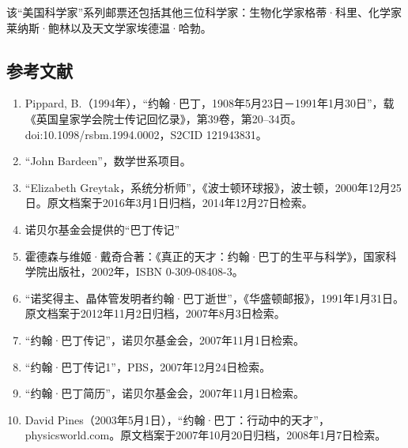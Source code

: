 该“美国科学家”系列邮票还包括其他三位科学家：生物化学家格蒂·科里、化学家莱纳斯·鲍林以及天文学家埃德温·哈勃。
\subsection{参考文献}
\begin{enumerate}
\item Pippard, B.（1994年），“约翰·巴丁，1908年5月23日－1991年1月30日”，载《英国皇家学会院士传记回忆录》，第39卷，第20–34页。doi:10.1098/rsbm.1994.0002，S2CID 121943831。
\item “John Bardeen”，数学世系项目。
\item “Elizabeth Greytak，系统分析师”，《波士顿环球报》，波士顿，2000年12月25日。原文档案于2016年3月1日归档，2014年12月27日检索。
\item 诺贝尔基金会提供的“巴丁传记”
\item 霍德森与维姬·戴奇合著：《真正的天才：约翰·巴丁的生平与科学》，国家科学院出版社，2002年，ISBN 0-309-08408-3。
\item “诺奖得主、晶体管发明者约翰·巴丁逝世”，《华盛顿邮报》，1991年1月31日。原文档案于2012年11月2日归档，2007年8月3日检索。
\item “约翰·巴丁传记”，诺贝尔基金会，2007年11月1日检索。
\item “约翰·巴丁传记1”，PBS，2007年12月24日检索。
\item “约翰·巴丁简历”，诺贝尔基金会，2007年11月1日检索。
\item David Pines（2003年5月1日），“约翰·巴丁：行动中的天才”，physicsworld.com。原文档案于2007年10月20日归档，2008年1月7日检索。
\end{enumerate}
